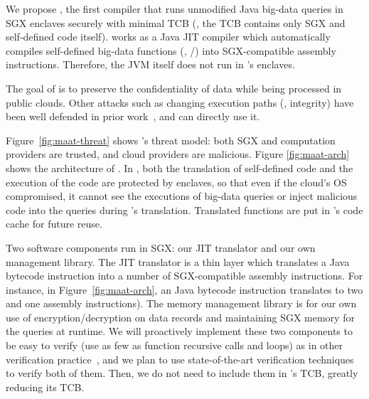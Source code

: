 We propose \maat, the first compiler that runs unmodified Java big-data queries 
in SGX enclaves securely with minimal TCB (\ie, the TCB contains only SGX and 
self-defined code itself). \maat works as a Java JIT compiler which 
automatically compiles self-defined big-data functions (\eg, 
/) into SGX-compatible assembly instructions. 
Therefore, the 
JVM itself does not run in \maat's enclaves.

The goal of \maat is to preserve the confidentiality of data while being 
processed in public clouds. Other attacks such as changing execution paths 
(\ie, integrity) have been well defended in prior work~\cite{jitguard:ccs17}, 
and \maat can directly use it.

Figure~\ref{fig:maat-threat} shows \maat's threat model: both SGX and 
computation providers are trusted, and cloud providers are malicious. Figure 
\ref{fig:maat-arch} shows the architecture of \maat. In \maat, both the 
translation of self-defined code and the execution of the code are protected by 
enclaves, so that even if the cloud's OS compromised, it cannot see the 
executions of big-data queries or inject malicious code into the queries during 
\maat's translation. Translated functions are put in \maat's code cache for 
future reuse.

Two \maat software components run in SGX: our JIT translator 
and our own management library. The JIT translator is a thin layer which 
translates a Java bytecode instruction into a number of SGX-compatible 
assembly instructions. For instance, in Figure~\ref{fig:maat-arch}, an 
 Java bytecode instruction translates to two  and one 
 assembly instructions). The memory management library is for our own 
use of encryption/decryption on data records and maintaining SGX memory for the 
queries at runtime. We will proactively implement these two components to be 
easy to verify (use as few as function recursive calls and loops) as in other 
verification practice~\cite{xi:sosp17}, and we plan to use state-of-the-art 
verification techniques~\cite{xi:sosp17} to verify both of them. Then, we do not 
need to include them in \maat's TCB, greatly reducing its TCB.





